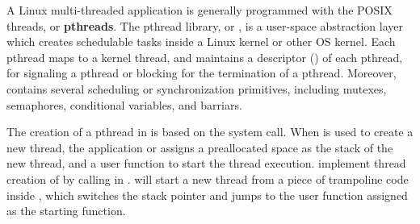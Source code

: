 \label{sec:libos:thread}


A Linux multi-threaded application
is generally programmed with the POSIX threads, or {\bf pthreads}.
The pthread library, or \libpthread{},
is a user-space abstraction layer
which creates schedulable tasks inside a Linux kernel or other OS kernel.
Each pthread maps to a kernel thread,
and \libpthread{} maintains a descriptor () of each pthread,
for signaling a pthread or blocking for the termination of a pthread.
Moreover,
\libpthread{}contains several scheduling or synchronization primitives, including mutexes, semaphores, conditional variables, and barriars.


The creation of a pthread in \libpthread{} is based on the  system call.
When  is used to create a new thread,
the application or \libpthread{} assigns a preallocated space as the stack of the new thread, and a user function to start the thread execution.
\thelibos{} implement thread creation of  by calling  in \thehostabi{}.
 will start a new thread from a piece of trampoline code inside \thelibos{}, which switches the stack pointer and jumps to the user function assigned as the starting function.









